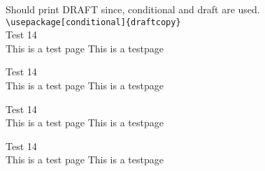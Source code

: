 \documentclass[draft,a4paper]{article}
\newcommand{\xx}{
Test 14\\This is a test page \thepage \vfill
This is a testpage \thepage \newpage
}
\begin{document}
Should print DRAFT since, conditional and draft are used.\\
\verb|\usepackage[conditional]{draftcopy}|\\
\xx\xx\xx\xx
\end{document}
